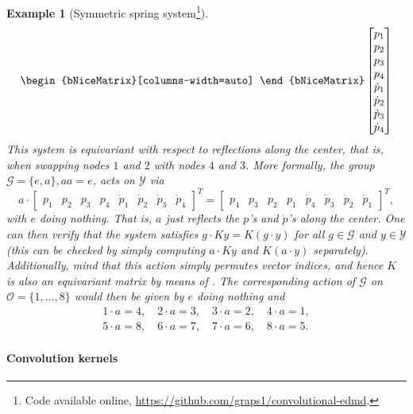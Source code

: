 \documentclass[preprint,12pt,authoryear]{elsarticle}
\newcommand\Gc{\mathcal G}
\newcommand\Oc{\mathcal O}
\newcommand\Yc{\mathcal Y}
\newtheorem{example}{Example}[section]%
\begin{document}
{\begin{example}[Symmetric spring system\footnote{Code available online, \url{https://github.com/graps1/convolutional-edmd}.}]
$$\begin{bNiceMatrix}[columns-width=auto]
        \end{bNiceMatrix} 
        \begin{bmatrix}
            p_1 \\
            p_2 \\
            p_3 \\
            p_4 \\
            \dot p_1 \\
            \dot p_2 \\
            \dot p_3 \\
            \dot p_4 
        \end{bmatrix}
    $$
    This system is equivariant with respect to reflections along the center, that is, when swapping nodes $1$ and $2$ with nodes $4$ and $3$. More formally, the group $\Gc = \{e,a\}, aa = e$, acts on $\Yc$ via
    $$
        a \cdot \begin{bmatrix} 
            p_1 & p_2& p_3& p_4& \dot p_1& \dot p_2& \dot p_3& \dot p_4
        \end{bmatrix}^T = 
        \begin{bmatrix} 
            p_4& p_3& p_2&p_1&\dot p_4& \dot p_3&\dot p_2& \dot p_1
        \end{bmatrix}^T,
    $$
    with $e$ doing nothing. 
    That is, $a$ just reflects the $p$'s and $\dot p$'s along the center. 
    One can then verify that the system satisfies $g \cdot K y = K (g \cdot y)$ for all $g \in \Gc$ and $y \in \Yc$ (this can be checked by simply computing $a \cdot Ky$ and $K (a \cdot y)$ separately). Additionally, mind that this action simply permutes vector indices, and hence $K$ is also an equivariant matrix by means of . The corresponding action of $\Gc$ on $\Oc = \{1,\dots,8\}$ would then be given by $e$ doing nothing and
    \begin{equation}
    \begin{split}
        1 \cdot a = 4, \quad 2 \cdot a = 3, \quad 3 \cdot a = 2, \quad 4 \cdot a = 1, \\
        5 \cdot a = 8, \quad 6 \cdot a = 7, \quad 7 \cdot a = 6, \quad 8 \cdot a = 5.
        \label{eq:spring-example-group-action}
    \end{split}
    \end{equation}
\end{example}



\paragraph{Convolution kernels}

}
\end{document}
